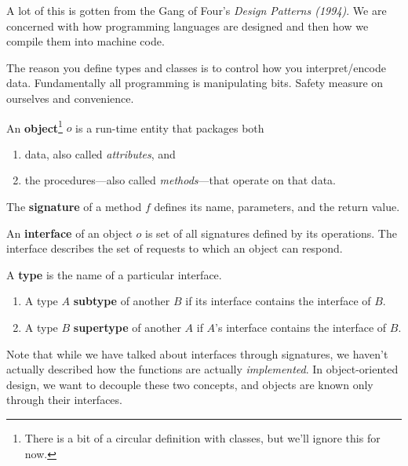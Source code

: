 A lot of this is gotten from the Gang of Four's \textit{Design Patterns (1994)}. We are concerned with how programming languages are designed and then how we compile them into machine code. 

The reason you define types and classes is to control how you interpret/encode data. Fundamentally all programming is manipulating bits. Safety measure on ourselves and convenience. 

\begin{definition}[Object]
  An \textbf{object}\footnote{There is a bit of a circular definition with classes, but we'll ignore this for now.} $o$ is a run-time entity that packages both 
  \begin{enumerate}
    \item data, also called \textit{attributes}, and 
    \item the procedures---also called \textit{methods}---that operate on that data.
  \end{enumerate}
\end{definition} 

\begin{definition}[Signature]
  The \textbf{signature} of a method $f$ defines its name, parameters, and the return value.  
\end{definition}

\begin{definition}[Interface]
  An \textbf{interface} of an object $o$ is set of all signatures defined by its operations. The interface describes the set of requests to which an object can respond. 
\end{definition} 

\begin{definition}[Type]
  A \textbf{type} is the name of a particular interface. 
  \begin{enumerate}
    \item A type $A$ \textbf{subtype} of another $B$ if its interface contains the interface of $B$. 
    \item A type $B$ \textbf{supertype} of another $A$ if $A$'s interface contains the interface of $B$. 
  \end{enumerate}
\end{definition} 

Note that while we have talked about interfaces through signatures, we haven't actually described how the functions are actually \textit{implemented}. In object-oriented design, we want to decouple these two concepts, and objects are known only through their interfaces. 

